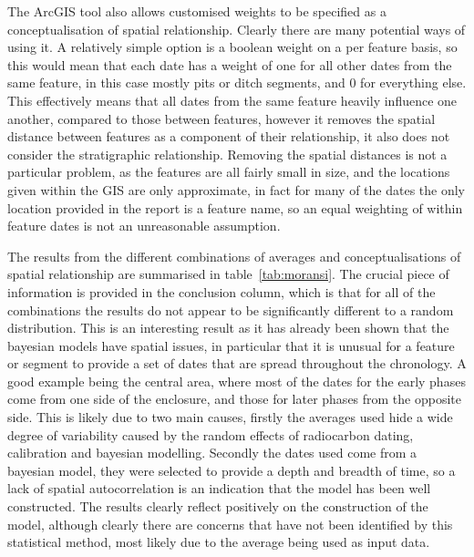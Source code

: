 The ArcGIS tool also allows customised weights to be specified as a conceptualisation of spatial relationship. Clearly there are many potential ways of using it. A relatively simple option is a boolean weight on a per feature basis, so this would mean that each date has a weight of one for all other dates from the same feature, in this case mostly pits or ditch segments, and 0 for everything else. This effectively means that all dates from the same feature heavily influence one another, compared to those between features, however it removes the spatial distance between features as a component of their relationship, it also does not consider the stratigraphic relationship.
Removing the spatial distances is not a particular problem, as the features are all fairly small in size, and the locations given within the GIS are only approximate, in fact for many of the dates the only location provided in the report is a feature name, so an equal weighting of within feature dates is not an unreasonable assumption.


The results from the different combinations of averages and conceptualisations of spatial relationship are summarised in table~\ref{tab:moransi}. The crucial piece of information is provided in the conclusion column, which is that for all of the combinations the results do not appear to be significantly different to a random distribution. This is an interesting result as it has already been shown that the bayesian models have spatial issues, in particular that it is unusual for a feature or segment to provide a set of dates that are spread throughout the chronology. A good example being the central area, where most of the dates for the early phases come from one side of the enclosure, and those for later phases from the opposite side. This is likely due to two main causes, firstly the averages used hide a wide degree of variability caused by the random effects of radiocarbon dating, calibration and bayesian modelling. Secondly the dates used come from a bayesian model, they were selected to provide a depth and breadth of time, so a lack of spatial autocorrelation is an indication that the model has been well constructed. The results clearly reflect positively on the construction of the model, although clearly there are concerns that have not been identified by this statistical method, most likely due to the average being used as input data.

